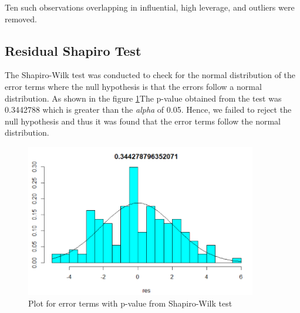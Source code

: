 Ten such observations overlapping in influential, high leverage, and outliers were removed. 

\subsection{Residual Shapiro Test}
\label{sec:residual-shapiro-test}
The Shapiro-Wilk test was conducted to check for the normal distribution of the error terms where the null hypothesis is that the errors follow a normal distribution. As shown in the figure \ref{fig:shapiro}The p-value obtained from the test was 0.3442788 which is greater than the \textit{alpha} of 0.05. Hence, we failed to reject the null hypothesis and thus it was found that the error terms follow the normal distribution. 

\begin{figure}
  \centering
  \includegraphics[width = 0.9\textwidth]{figures/Shapiro.PNG}
  \caption{Plot for error terms with p-value from Shapiro-Wilk test}
  \label{fig:shapiro}
\end{figure}


